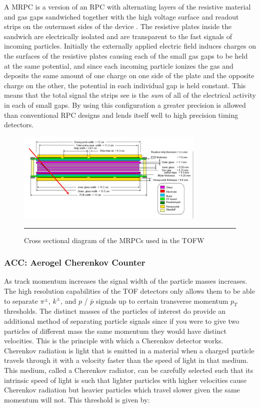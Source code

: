 A MRPC is a version of an RPC with alternating layers of the  resistive material and gas gaps sandwiched together with the high voltage surface and readout strips on the outermost sides of the device \citep{Akindinov:2000rq}. The resistive plates inside the sandwich are electrically isolated and are transparent to the fast signals of incoming particles. Initially the externally applied electric field induces charges on the surfaces of the resistive plates causing each of the small gas gaps to be held at the same potential, and since each incoming particle ionizes the gas and deposits the same amount of one charge on one side of the plate and the opposite charge on the other, the potential in each individual gap is held constant. This means that the total signal the strips see is the \textit{sum} of all of the electrical activity in each of small gaps. By using this configuration a greater precision is allowed than conventional RPC designs and lends itself well to high precision timing detectors.

\begin{figure}[ht!]
  \centering
    \includegraphics[width=0.8\textwidth]{Figures/MRPC_TOFW.jpg}
    \rule{35em}{0.5pt}
  \caption[Cross sectional diagram of the MRPCs used in the TOFW]{Cross sectional diagram of the MRPCs used in the TOFW}
  \label{fig:MRPCTOFW}
\end{figure}

\subsubsection{ACC: Aerogel Cherenkov Counter}
As track momentum increases the signal width of the particle masses increases. The high resolution capabilities of the TOF detectors only allows them to be able to separate $\pi^{\pm}$, $k^{\pm}$, and $p$ / $\bar{p}$ signals up to certain transverse momentum $p_{T}$ thresholds. The distinct masses of the particles of interest do provide an additional method of separating particle signals since if you were to give two particles of different mass the same momentum they would have distinct velocities. This is the principle with which a Cherenkov detector works. Cherenkov radiation is light that is emitted in a material when a charged particle travels through it with a velocity faster than the speed of light in that medium. This medium, called a Cherenkov radiator, can be carefully selected such that its intrinsic speed of light is such that lighter particles with higher velocities cause Cherenkov radiation but heavier particles which travel slower given the same momentum will not. This threshold is given by:

